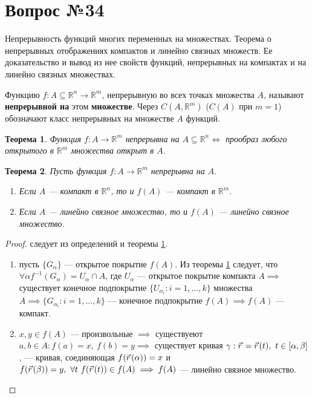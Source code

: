 \documentclass[12pt]{report}
\numberwithin{equation}{section}
\newtheorem{theorem}{Теорема}[section]
\newcommand{\pvec}[1]{\vec{#1}\mkern2mu\vphantom{#1}}
\begin{document}
\newpage \section{Вопрос №34} %
\begin{framed}
Непрерывность функций многих переменных на множествах. Теорема о непрерывных отображениях компактов и линейно связных множеств. Ее доказательство и вывод из нее свойств функций, непрерывных на компактах и на линейно связных множествах.
\end{framed}

Функцию $f : A \subseteq \mathbb{R}^n \to \mathbb{R}^m$, непрерывную во всех точках множества $A$, называют \textbf{непрерывной на} этом \textbf{множестве}. Через $C(A, \mathbb{R}^m)$ ($C(A)$ при $m = 1$) обозначают класс непрерывных на множестве $A$ функций.

\begin{theorem} \label{th:34:1}
Функция $f : A \to \mathbb{R}^m$ непрерывна на $A \subseteq \mathbb{R}^n \iff$ прообраз любого открытого в $\mathbb{R}^m$ множества открыт в $A$.
\end{theorem}

\begin{theorem} \label{th:34:2}
Пусть функция $f : A \to \mathbb{R}^m$ непрерывна на $A$.
\begin{enumerate}
\item[а)] Если $A$ --- компакт в $\mathbb{R}^n$, то и $f(A)$ --- компакт в $\mathbb{R}^m$.
\item[б)] Если $A$ --- линейно связное множество, то и $f(A)$ --- линейно связное множество.
\end{enumerate}
\end{theorem}
\begin{proof}
следует из определений и теоремы \ref{th:34:1}.
\begin{enumerate}
\item[а):] пусть $\{ G_{\alpha} \}$ --- открытое покрытие $f(A)$. Из теоремы \ref{th:34:1} следует, что $\forall \alpha f^{-1} (G_{\alpha}) = U_{\alpha} \cap A$, где $U_{\alpha}$ --- открытое покрытие компакта $A \implies$ существует конечное подпокрытие $\{ U_{\alpha_i} : i = 1,\ldots, k\}$ множества $A \implies \{ G_{\alpha_i} : i = 1, \ldots, k\}$ --- конечное подпокрытие $f(A) \implies f(A)$ --- компакт.
\item[б):] $x,y \in f(A)$ --- произвольные $\implies$ существуеют $a,b \in A : f(a) = x,~ f(b) = y \implies$ существует кривая $\gamma : \pvec{r} = \pvec{r}(t),~t \in [\alpha, \beta]$, --- кривая, соединяющая $f(\pvec{r}(\alpha)) = x$ и $f(\pvec{r}(\beta)) = y,~\forall t~f(\pvec{r}(t)) \in f(A) \implies f(A)$ --- линейно связное множество.
\end{enumerate}
\end{proof}
\end{document}
